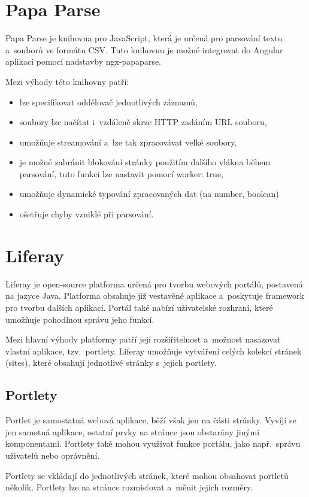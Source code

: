 \documentclass[
  digital, %
  oneside, %
  table,   %
  nolof,     %
  nolot,     %
  nocover
]{fithesis3}
\begin{document}
\section{Papa Parse}
Papa Parse je knihovna pro JavaScript, která je určená pro parsování textu a~souborů ve formátu CSV. Tuto knihovnu je možné integrovat do Angular aplikací pomocí nadstavby ngx-papaparse.\par
Mezi výhody této knihovny patří: \cite{papa}
\begin{itemize}
  \item lze specifikovat oddělovač jednotlivých záznamů,
  \item soubory lze načítat i~vzdáleně skrze HTTP zadáním URL souboru,
  \item umožňuje streamování a~lze tak zpracovávat velké soubory,
  \item je možné zabránit blokování stránky použitím dalšího vlákna během parsování, tuto funkci lze nastavit pomocí worker: true,
  \item umožňuje dynamické typování zpracovaných dat (na number, boolean)
  \item ošetřuje chyby vzniklé při parsování.
\end{itemize}

\section{Liferay} \label{liferay}
Liferay je open-source platforma určená pro tvorbu webových portálů, postavená na jazyce Java. Platforma obsahuje již vestavěné aplikace a~poskytuje framework pro tvorbu dalších aplikací. Portál také nabízí uživatelské rozhraní, které umožňuje pohodlnou správu jeho funkcí.\par
Mezi hlavní výhody platformy patří její rozšiřitelnost a~možnost nasazovat vlastní aplikace, tzv.~portlety. Liferay umožňuje vytváření celých kolekcí stránek (sites), které obsahují jednotlivé stránky s~jejich portlety.\cite{liferay}
\subsection{Portlety}
Portlet je samostatná webová aplikace, běží však jen na části stránky. Vyvíjí se jen samotná aplikace, ostatní prvky na stránce jsou obstarány jinými komponentami. Portlety také mohou využívat funkce portálu, jako např.~správu uživatelů nebo oprávnění.\par
Portlety se vkládají do jednotlivých stránek, které mohou obsahovat portletů několik. Portlety lze na stránce rozmisťovat a~měnit jejich rozměry. \cite{liferay}
\end{document}
